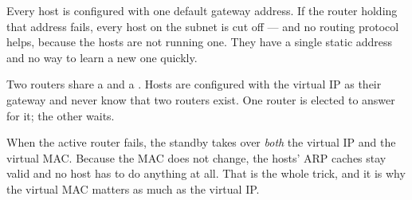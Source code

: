 Every host is configured with one default gateway address. If the router holding
that address fails, every host on the subnet is cut off --- and no routing
protocol helps, because the hosts are not running one. They have a single static
address and no way to learn a new one quickly.

\begin{conceptbox}
Two routers share a  and a .
Hosts are configured with the virtual IP as their gateway and never know that
two routers exist. One router is elected to answer for it; the other waits.

When the active router fails, the standby takes over \emph{both} the virtual IP
and the virtual MAC. Because the MAC does not change, the hosts' ARP caches stay
valid and no host has to do anything at all. That is the whole trick, and it is
why the virtual MAC matters as much as the virtual IP.
\end{conceptbox}

